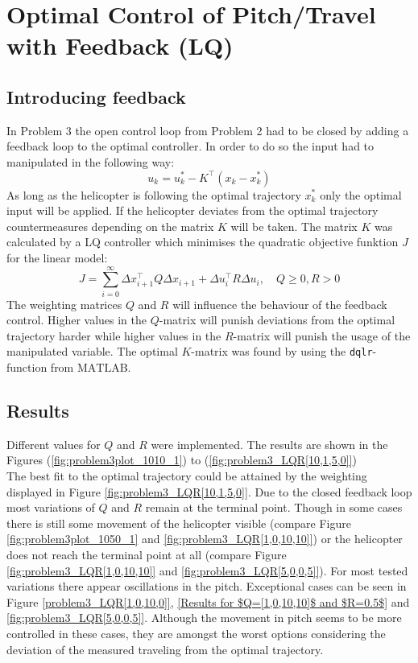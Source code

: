 \section{Optimal Control of Pitch/Travel with Feedback (LQ)}\label{sec:prob3}

\subsection{Introducing feedback}\label{sec:prob31}
In Problem 3 the open control loop from Problem 2 had to be closed by adding a feedback loop to the optimal controller. In order to do so the input had to manipulated in the following way:
\begin{equation}
	u_k=u_k^*-K^\top(x_k-x_k^*)
\end{equation}
As long as the helicopter is following the optimal trajectory $x_k^*$ only the optimal input will be applied. If the helicopter deviates from the optimal trajectory countermeasures depending on the matrix $K$ will be taken. The matrix $K$ was calculated by a LQ controller which minimises the quadratic objective funktion $J$ for the linear model:
\begin{equation}
	J=\displaystyle\sum_{i=0}^{\infty} \Delta x_{i+1}^\top Q \Delta x_{i+1} + \Delta u_i^\top R \Delta u_i, \quad Q \geq 0, R >0
\end{equation}
The weighting matrices $Q$ and $R$ will influence the behaviour of the feedback control. Higher values in the $Q$-matrix will punish deviations from the optimal trajectory harder while higher values in the $R$-matrix will punish the usage of the manipulated variable. The optimal $K$-matrix was found by using the \texttt{dqlr}-function from $\mathrm{MATLAB}$. 
\subsection{Results}\label{sec:prob32}
Different values for $Q$ and $R$ were implemented. The results are shown in the Figures (\ref{fig:problem3plot_1010_1}) to (\ref{fig:problem3_LQR[10,1,5,0]}) \\
The best fit to the optimal trajectory could be attained by the weighting displayed in Figure \ref{fig:problem3_LQR[10,1,5,0]}. Due to the closed feedback loop most variations of $Q$ and $R$ remain at the terminal point. Though in some cases there is still some movement of the helicopter visible (compare Figure \ref{fig:problem3plot_1050_1} and \ref{fig:problem3_LQR[1,0,10,10]}) or the helicopter does not reach the terminal point at all (compare Figure \ref{fig:problem3_LQR[1,0,10,10]} and \ref{fig:problem3_LQR[5,0,0,5]}). For most tested variations there appear oscillations in the pitch. Exceptional cases can be seen in Figure \ref{problem3_LQR[1,0,10,0]}, \ref{Results for $Q=[1,0,10,10]$ and $R=0.5$} and \ref{fig:problem3_LQR[5,0,0,5]}. Although the movement in pitch seems to be more controlled in these cases, they are amongst the worst options considering the deviation of the measured traveling from the optimal trajectory.

